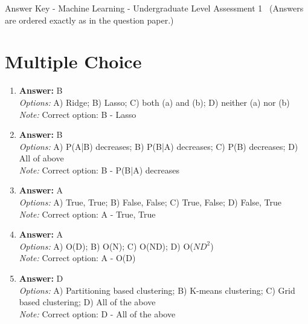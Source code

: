 \documentclass[12pt]{article}
\begin{document}
\begin{center}
Answer Key - Machine Learning - Undergraduate Level Assessment 1 \
\small (Answers are ordered exactly as in the question paper.)
\end{center}

\section*{Multiple Choice}
\begin{enumerate}[label=\arabic*.]
\item \textbf{Answer:} B
\\ \textit{Options:} A) Ridge; B) Lasso; C) both (a) and (b); D) neither (a) nor (b)
\\ \textit{Note:} Correct option: B - Lasso
\item \textbf{Answer:} B
\\ \textit{Options:} A) P(A|B) decreases; B) P(B|A) decreases; C) P(B) decreases; D) All of above
\\ \textit{Note:} Correct option: B - P(B|A) decreases
\item \textbf{Answer:} A
\\ \textit{Options:} A) True, True; B) False, False; C) True, False; D) False, True
\\ \textit{Note:} Correct option: A - True, True
\item \textbf{Answer:} A
\\ \textit{Options:} A) O(D); B) O(N); C) O(ND); D) O($ND^2$)
\\ \textit{Note:} Correct option: A - O(D)
\item \textbf{Answer:} D
\\ \textit{Options:} A) Partitioning based clustering; B) K-means clustering; C) Grid based clustering; D) All of the above
\\ \textit{Note:} Correct option: D - All of the above
\end{enumerate}
\end{document}

